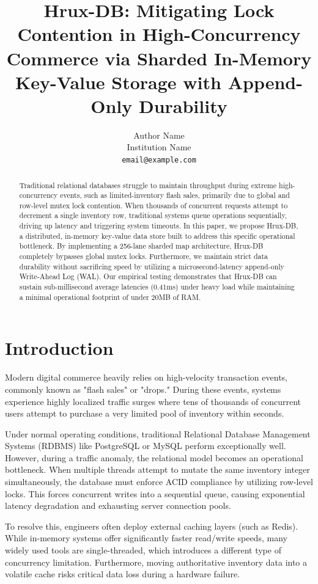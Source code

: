 \documentclass[10pt,twocolumn,letterpaper]{article}
\title{Hrux-DB: Mitigating Lock Contention in High-Concurrency Commerce via Sharded In-Memory Key-Value Storage with Append-Only Durability}
\author{
Author Name \\
Institution Name\\
{\tt\small email@example.com}
}
\begin{document}
\maketitle

\begin{abstract}
Traditional relational databases struggle to maintain throughput during extreme high-concurrency events, such as limited-inventory flash sales, primarily due to global and row-level mutex lock contention. When thousands of concurrent requests attempt to decrement a single inventory row, traditional systems queue operations sequentially, driving up latency and triggering system timeouts. In this paper, we propose Hrux-DB, a distributed, in-memory key-value data store built to address this specific operational bottleneck. By implementing a 256-lane sharded map architecture, Hrux-DB completely bypasses global mutex locks. Furthermore, we maintain strict data durability without sacrificing speed by utilizing a microsecond-latency append-only Write-Ahead Log (WAL). Our empirical testing demonstrates that Hrux-DB can sustain sub-millisecond average latencies (0.41ms) under heavy load while maintaining a minimal operational footprint of under 20MB of RAM.
\end{abstract}

\section{Introduction}

Modern digital commerce heavily relies on high-velocity transaction events, commonly known as "flash sales" or "drops." During these events, systems experience highly localized traffic surges where tens of thousands of concurrent users attempt to purchase a very limited pool of inventory within seconds. 

Under normal operating conditions, traditional Relational Database Management Systems (RDBMS) like PostgreSQL or MySQL perform exceptionally well. However, during a traffic anomaly, the relational model becomes an operational bottleneck. When multiple threads attempt to mutate the same inventory integer simultaneously, the database must enforce ACID compliance by utilizing row-level locks. This forces concurrent writes into a sequential queue, causing exponential latency degradation and exhausting server connection pools.

To resolve this, engineers often deploy external caching layers (such as Redis). While in-memory systems offer significantly faster read/write speeds, many widely used tools are single-threaded, which introduces a different type of concurrency limitation. Furthermore, moving authoritative inventory data into a volatile cache risks critical data loss during a hardware failure.
\end{document}
